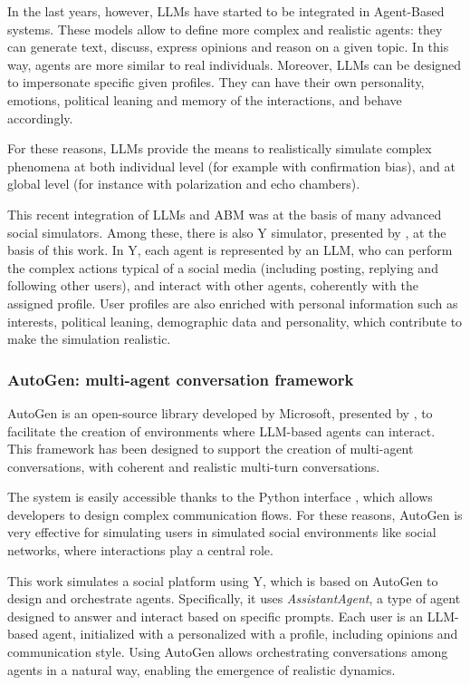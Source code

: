 \medskip
In the last years, however, LLMs have started to be integrated in Agent-Based systems.
These models allow to define more complex and realistic agents: they can generate text, discuss, express opinions and reason on a given topic. 
In this way, agents are more similar to real individuals.
Moreover, LLMs can be designed to impersonate specific given profiles. They can have their own personality, emotions, political leaning and memory of the interactions, and behave accordingly.

For these reasons, LLMs provide the means to realistically simulate complex phenomena at both individual level (for example with confirmation bias), and at global level (for instance with polarization and echo chambers).

\medskip
This recent integration of LLMs and ABM was at the basis of many advanced social simulators.
Among these, there is also Y simulator, presented by \citet{rossetti2024ysocialllmpoweredsocial}, at the basis of this work.
In Y, each agent is represented by an LLM, who can perform the complex actions typical of a social media (including posting, replying and following other users), and interact with other agents, coherently with the assigned profile.
User profiles are also enriched with personal information such as interests, political leaning, demographic data and personality, which contribute to make the simulation realistic.


\subsubsection{AutoGen: multi-agent conversation framework}
AutoGen is an open-source library developed by Microsoft, presented by \citet{wu2023autogenenablingnextgenllm}, to facilitate the creation of environments where LLM-based agents can interact.
This framework has been designed to support the creation of multi-agent conversations, with coherent and realistic multi-turn conversations. 

\medskip
The system is easily accessible thanks to the Python interface \cite{pyautogen0.2.31}, which allows developers to design complex communication flows.
For these reasons, AutoGen is very effective for simulating users in simulated social environments like social networks, where interactions play a central role.

\medskip
This work simulates a social platform using Y\cite{rossetti2024ysocialllmpoweredsocial}, which is based on AutoGen to design and orchestrate agents.
Specifically, it uses \textit{AssistantAgent}, a type of agent designed to answer and interact based on specific prompts.
Each user is an LLM-based agent, initialized with a personalized with a profile, including opinions and communication style.
Using AutoGen allows orchestrating conversations among agents in a natural way, enabling the emergence of realistic dynamics.



